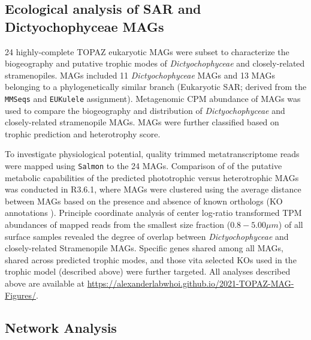 \documentclass[12pt]{article}
\numberwithin{equation}{section}
\begin{document}
\subsection*{Ecological analysis of SAR and Dictyochophyceae MAGs}
24 highly-complete TOPAZ eukaryotic MAGs were subset to characterize the biogeography and putative trophic modes of \emph{Dictyochophyceae} and closely-related stramenopiles. MAGs included 11 \emph{Dictyochophyceae} MAGs and 13 MAGs belonging to a phylogenetically similar branch (Eukaryotic SAR; derived from the \texttt{MMSeqs} and \texttt{EUKulele} assignment). Metagenomic CPM abundance of MAGs was used to compare the biogeography and distribution of \emph{Dictyochophyceae} and closely-related stramenopile MAGs. MAGs were further classified based on trophic prediction and heterotrophy score. 

To investigate physiological potential, quality trimmed metatranscriptome reads were mapped using \texttt{Salmon} \cite{Patro2017Salmon} to the 24 MAGs. Comparison of of the putative metabolic capabilities of the predicted phototrophic versus heterotrophic MAGs was conducted in R3.6.1, where MAGs were clustered using the average distance between MAGs based on the presence and absence of known orthologs (KO annotations \citep{Kanehisa_2019}). Principle coordinate analysis of center log-ratio transformed TPM abundances of mapped reads from the smallest size fraction ($0.8 - 5.00 \mu m$) of all surface samples revealed the degree of overlap between \emph{Dictyochophyceae} and closely-related Stramenopile MAGs. Specific genes shared among all MAGs, shared across predicted trophic modes, and those vita selected KOs used in the trophic model (described above) were further targeted. All analyses described above are available at \url{ https://alexanderlabwhoi.github.io/2021-TOPAZ-MAG-Figures/}. 

\subsection*{Network Analysis} 
\end{document}
